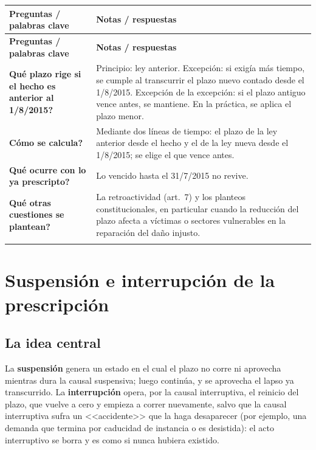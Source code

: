 \documentclass[12pt,oneside]{book}
\newenvironment{cornell}{%
  \par\medskip\noindent
  \begin{longtable}{>{\raggedright\arraybackslash}p{0.25\textwidth}>{\raggedright\arraybackslash}p{0.69\textwidth}}
  \toprule
  \textbf{Preguntas / palabras clave} & \textbf{Notas / respuestas} \\
  \midrule
  \endfirsthead
  \toprule
  \textbf{Preguntas / palabras clave} & \textbf{Notas / respuestas} \\
  \midrule
  \endhead
}{%
  \bottomrule
  \end{longtable}
}
\newcommand{\cq}[2]{\textbf{#1} & #2 \\ \addlinespace[0.5em]}
\newcommand{\cresumen}[1]{\midrule \multicolumn{2}{p{0.94\textwidth}}{\textbf{Resumen:} #1} \\}
\begin{document}
\begin{cornell}
\cq{\textquestiondown Qu\'e plazo rige si el hecho es anterior al 1/8/2015?}{Principio: ley anterior. Excepci\'on: si exig\'ia m\'as tiempo, se cumple al transcurrir el plazo nuevo contado desde el 1/8/2015. Excepci\'on de la excepci\'on: si el plazo antiguo vence antes, se mantiene. En la pr\'actica, se aplica el plazo menor.}
\cq{\textquestiondown C\'omo se calcula?}{Mediante dos l\'ineas de tiempo: el plazo de la ley anterior desde el hecho y el de la ley nueva desde el 1/8/2015; se elige el que vence antes.}
\cq{\textquestiondown Qu\'e ocurre con lo ya prescripto?}{Lo vencido hasta el 31/7/2015 no revive.}
\cq{\textquestiondown Qu\'e otras cuestiones se plantean?}{La retroactividad (art.\ 7) y los planteos constitucionales, en particular cuando la reducci\'on del plazo afecta a v\'ictimas o sectores vulnerables en la reparaci\'on del da\~no injusto.}
\cresumen{Los plazos en curso se rigen por la ley anterior, salvo que esta exija m\'as tiempo que la nueva contado desde el 1.\textordmasculine\ de agosto de 2015, en cuyo caso se aplica el menor. Lo ya vencido no revive. El m\'etodo pr\'actico consiste en trazar dos l\'ineas de tiempo y quedarse con el plazo que vence antes.}
\end{cornell}

\chapter[Suspensi\'on e interrupci\'on]{Suspensi\'on e interrupci\'on de la prescripci\'on}

\section{La idea central}

La \textbf{suspensi\'on} genera un estado en el cual el plazo no corre ni aprovecha mientras dura la causal suspensiva; luego contin\'ua, y se aprovecha el lapso ya transcurrido. La \textbf{interrupci\'on} opera, por la causal interruptiva, el reinicio del plazo, que vuelve a cero y empieza a correr nuevamente, salvo que la causal interruptiva sufra un <<accidente>> que la haga desaparecer (por ejemplo, una demanda que termina por caducidad de instancia o es desistida): el acto interruptivo se borra y es como si nunca hubiera existido.
\end{document}
